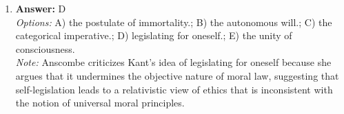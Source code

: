 \documentclass[12pt]{article}
\begin{document}
\begin{enumerate}[label=\arabic*.]
\\ \textit{Note:} The key to liberation in Sikhism is found in faith in God because it emphasizes the belief that surrendering to the divine will and cultivating a deep spiritual connection with God leads to liberation from the cycle of birth and death.
\item \textbf{Answer:} D
\\ \textit{Options:} A) the postulate of immortality.; B) the autonomous will.; C) the categorical imperative.; D) legislating for oneself.; E) the unity of consciousness.
\\ \textit{Note:} Anscombe criticizes Kant's idea of legislating for oneself because she argues that it undermines the objective nature of moral law, suggesting that self-legislation leads to a relativistic view of ethics that is inconsistent with the notion of universal moral principles.
\end{enumerate}
\end{document}
